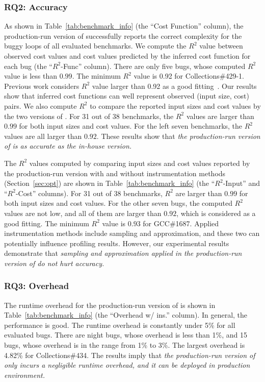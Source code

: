 \subsubsection{RQ2: Accuracy}
As shown in Table~\ref{tab:benchmark_info} (the ``Cost Function'' column),
the production-run version of \Tool successfully 
reports the correct complexity for the buggy loops of 
all evaluated benchmarks. 
We compute the $R^2$ value between observed cost values and 
cost values predicted by the inferred cost function for each bug 
(the ``$R^2$-Func'' column).  
There are only five bugs, whose computed $R^2$ value is less than $0.99$.
The minimum $R^2$ value is 0.92 for Collections\#429-1. 
Previous work considers $R^2$ value larger than 0.92 
as a good fitting~\cite{rsquare-value}.
Our results show that inferred cost functions can well represent 
observed (input size, cost) pairs. 
We also compute $R^2$ to compare the reported input sizes 
and cost values by the two versions of \Tool. 
For 31 out of 38 benchmarks, 
the $R^2$ values are larger than $0.99$ for both input sizes and cost values. 
For the left seven benchmarks, the $R^2$ values are all larger than $0.92$. 
These results show that \emph{the production-run version of \Tool is 
as accurate as the in-house version. 
}

The $R^2$ values computed by comparing input sizes and cost values 
reported by the production-run version with and without 
instrumentation methods (Section~\ref{sec:opt}) are shown in 
Table~\ref{tab:benchmark_info} 
(the ``$R^2$-Input'' and ``$R^2$-Cost'' columns).
For 31 out of 38 benchmarks, $R^2$ are larger than $0.99$ for 
both input sizes and cost values. 
For the other seven bugs, the computed $R^2$ values are not low, 
and all of them are larger than $0.92$, which is considered as a good fitting. 
The minimum $R^2$ value is $0.93$ for GCC\#1687.
Applied instrumentation methods include
sampling and approximation, and these two can potentially influence profiling results.
However, our experimental results demonstrate that \emph{sampling and approximation 
applied in the production-run version of \Tool do not hurt accuracy. 
}

\subsubsection{RQ3: Overhead}

The runtime overhead for the production-run version of \Tool is 
shown in Table~\ref{tab:benchmark_info} (the ``Overhead w/ ins.'' column). 
In general, the performance is good. 
The runtime overhead is constantly 
under 5\% for all evaluated bugs. 
There are night bugs, whose overhead is less than 1\%, 
and 15 bugs, whose overhead is in the range from 1\% to 3\%.  
The largest overhead is 4.82\% for Collections\#434. 
The results imply that \emph{the production-run version of 
\Tool only incurs a negligible runtime overhead, 
and it can be deployed in production environment.}

